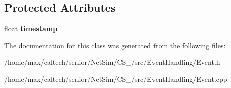 \subsection*{\-Protected \-Attributes}
\begin{DoxyCompactItemize}
\item 
\hypertarget{classEvent_a7ceeca46ae28fce79241258b78c383de}{float {\bfseries timestamp}}\label{classEvent_a7ceeca46ae28fce79241258b78c383de}

\end{DoxyCompactItemize}


\-The documentation for this class was generated from the following files\-:\begin{DoxyCompactItemize}
\item 
/home/max/caltech/senior/\-Net\-Sim/\-C\-S\-\_/src/\-Event\-Handling/\-Event.\-h\item 
/home/max/caltech/senior/\-Net\-Sim/\-C\-S\-\_/src/\-Event\-Handling/\-Event.\-cpp\end{DoxyCompactItemize}
